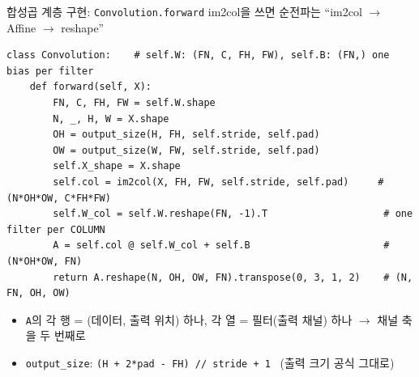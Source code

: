 \documentclass[aspectratio=169,11pt]{beamer}
\begin{document}
\begin{frame}[fragile]{합성곱 계층 구현: \texttt{Convolution.forward}}
\small im2col을 쓰면 순전파는 ``im2col $\to$ Affine $\to$ reshape''
\begin{lstlisting}
class Convolution:    # self.W: (FN, C, FH, FW), self.B: (FN,) one bias per filter
    def forward(self, X):
        FN, C, FH, FW = self.W.shape
        N, _, H, W = X.shape
        OH = output_size(H, FH, self.stride, self.pad)
        OW = output_size(W, FW, self.stride, self.pad)
        self.X_shape = X.shape
        self.col = im2col(X, FH, FW, self.stride, self.pad)     # (N*OH*OW, C*FH*FW)
        self.W_col = self.W.reshape(FN, -1).T                    # one filter per COLUMN
        A = self.col @ self.W_col + self.B                       # (N*OH*OW, FN)
        return A.reshape(N, OH, OW, FN).transpose(0, 3, 1, 2)    # (N, FN, OH, OW)
\end{lstlisting}
\begin{itemize}
\item \texttt{A}의 각 행 = (데이터, 출력 위치) 하나, 각 열 = 필터(출력 채널) 하나 $\to$ 채널 축을 두 번째로
\item \texttt{output\_size}: \texttt{(H + 2*pad - FH) // stride + 1} \ (출력 크기 공식 그대로)
\end{itemize}
\end{frame}
\end{document}
